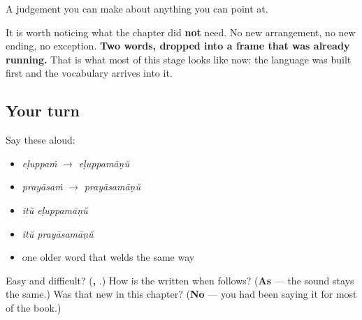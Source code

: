 \begin{grammarlens}[title={What you've built}]
A judgement you can make about anything you can point at.

It is worth noticing what the chapter did \textbf{not} need. No new arrangement, no new ending, no exception. \textbf{Two words, dropped into a frame that was already running.} That is what most of this stage looks like now: the language was built first and the vocabulary arrives into it.
\end{grammarlens}

\subsection*{Your turn}
Say these aloud:

\begin{itemize}
\raggedright
  \item \emph{eḷuppaṁ} $\to$ \emph{eḷuppamāṇŭ}
  \item \emph{prayāsaṁ} $\to$ \emph{prayāsamāṇŭ}
  \item \emph{itŭ eḷuppamāṇŭ}
  \item \emph{itŭ prayāsamāṇŭ}
  \item one older word that welds the same way
\end{itemize}

\begin{tcolorbox}[breakable,colback=teal!4,colframe=teal!35!black,title={Before you move on}]
Easy and difficult? (\textbf{, }.) How is the \textbf{} written when \textbf{} follows? (\textbf{As } — the sound stays the same.) Was that new in this chapter? (\textbf{No} — you had been saying it for most of the book.)
\end{tcolorbox}
